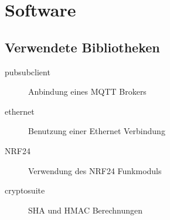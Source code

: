 \documentclass[
  12pt, %
  a4paper, %
  oneside, %
  openany, 
  numbers=noenddot, %
  BCOR=5mm, %
  parskip=half*, %
  thesis, %
]{bfhbook}
\begin{document}
\section{Software}
 \subsection{Verwendete Bibliotheken}

  \begin{description}
\item[pubsubclient] Anbindung eines MQTT Brokers \cite{pubsubclient}
\item[ethernet] Benutzung einer Ethernet Verbindung \cite{ethernet}
\item[NRF24] Verwendung des NRF24 Funkmoduls \cite{nrf24Arduino}
\item[cryptosuite] SHA und HMAC Berechnungen \cite{cryptosuite}
 \end{description}
\end{document}
